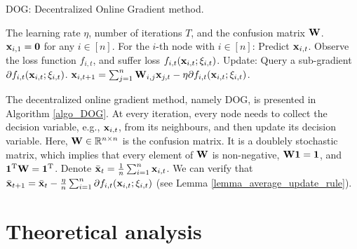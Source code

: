 \documentclass{article}
\begin{document}
\begin{algorithm}[!]
   \caption{\textsc{DOG}: Decentralized Online Gradient method.}
   \label{algo_DOG}
   \begin{algorithmic}[1]
   \REQUIRE The learning rate $\eta$, number of iterations $T$, and the confusion matrix ${\bf W}$. ${\bf x}_{i,1} = {\bf 0}$ for any $i\in [n]$.
           \STATE For the $i$-th node with $i\in[n]$:
            \STATE \indent Predict ${\bf x}_{i,t}$.
            \STATE \indent Observe the loss function $f_{i,t}$,  and suffer loss $f_{i,t}({\bf x}_{i,t};\xi_{i,t})$.
            \STATE Update:
            \STATE \indent Query a sub-gradient $\partial f_{i,t}({\bf x}_{i,t};\xi_{i,t})$.  
            \STATE \indent ${\bf x}_{i,t+1} = \sum_{j=1}^n {\bf W}_{i,j}{\bf x}_{j,t} - \eta \partial f_{i,t}({\bf x}_{i,t};\xi_{i,t})$. 
       \ENDFOR
   \end{algorithmic}
\end{algorithm}


The decentralized online gradient method, namely \textsc{DOG}, is presented in Algorithm \ref{algo_DOG}. At every iteration, every node needs to collect the decision variable, e.g., ${\bf x}_{i,t}$, from its neighbours, and then update its decision variable.  Here, ${\bf W} \in\mathbb{R}^{n \times n}$ is the confusion matrix. It is a doublely stochastic matrix, which implies that every element of ${\bf W}$ is non-negative, ${\bf W} {\bf 1} = {\bf 1}$, and ${\bf 1}^{\rm T}{\bf W}  = {\bf 1}^{\rm T}$.  Denote $\bar{{\bf x}}_t = \frac{1}{n}\sum_{i=1}^n {\bf x}_{i,t}$. We can verify that $\bar{{\bf x}}_{t+1} =  \bar{{\bf x}}_t -  \frac{\eta}{n}\sum_{i=1}^n \partial f_{i,t}({\bf x}_{i,t};\xi_{i,t})$ (see Lemma \ref{lemma_average_update_rule}). 





\section{Theoretical analysis}
\end{document}
